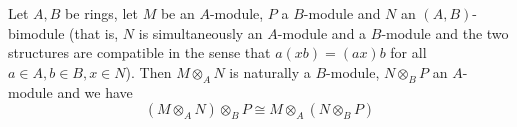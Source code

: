 \documentclass[11pt]{article}
\begin{document}

\begin{exercise}
\label{2.15}
Let \(A,B\) be rings, let \(M\) be an \(A\)-module, \(P\) a \(B\)-module and \(N\)
an \((A,B)\)-bimodule (that is, \(N\) is simultaneously an \(A\)-module and a \(B\)-module and
the two structures are compatible in the sense that \(a(xb)=(ax)b\) for all \(a\in A,b\in B,x\in N\)).
Then \(M\otimes_AN\) is naturally a \(B\)-module, \(N\otimes_BP\) an \(A\)-module and we have
\begin{equation*}
(M\otimes_AN)\otimes_BP\cong M\otimes_A(N\otimes_BP)
\end{equation*}
\end{exercise}
\end{document}
